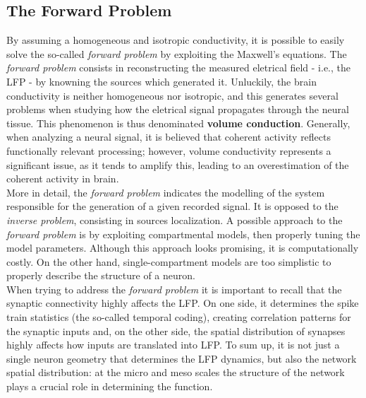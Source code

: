 \subsection{The Forward Problem}
By assuming a homogeneous and isotropic conductivity, it is possible to easily
solve the so-called \textit{forward problem} by exploiting the Maxwell's equations.
The \textit{forward problem} consists in reconstructing the measured eletrical field
- i.e., the LFP - by knowning the sources which generated it. Unluckily, the
brain conductivity is neither homogeneous nor isotropic, and this generates several
problems when studying how the eletrical signal propagates through the neural tissue.
This phenomenon is thus denominated \textbf{volume conduction}. Generally, when
analyzing a neural signal, it is believed that coherent activity reflects functionally
relevant processing; however, volume conductivity represents a significant issue, as
it tends to amplify this, leading to an overestimation of the coherent activity
in brain.\\
More in detail, the \textit{forward problem} indicates the modelling of the system
responsible for the generation of a given recorded signal. It is opposed to the
\textit{inverse problem}, consisting in sources localization. A possible approach
to the \textit{forward problem} is by exploiting compartmental models, then
properly tuning the model parameters. Although this approach looks promising,
it is computationally costly. On the other hand, single-compartment models
are too simplistic to properly describe the structure of a neuron.\\
When trying to address the \textit{forward problem} it is important to recall
that the synaptic connectivity highly affects the LFP. On one side, it
determines the spike train statistics (the so-called temporal coding), creating
correlation patterns for the synaptic inputs and, on the other side, the spatial
distribution of synapses highly affects how inputs are translated into LFP.
To sum up, it is not just a single neuron geometry that determines the LFP
dynamics, but also the network spatial distribution: at the micro and meso
scales the structure of the network plays a crucial role in determining
the function.

